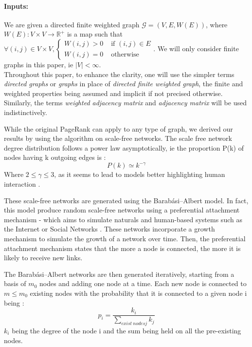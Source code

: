 \documentclass{article}
\begin{document}
\paragraph{Inputs:} We are given a directed finite weighted graph $\mathcal{G} = (V, E, W(E))$, where
$W(E) : V \times V \rightarrow \mathbb{R}^{+}$ is a map such that $\forall (i,j) \in V\times V, \left\{ \begin{array}{cc}
    W(i,j)>0 & \mbox{ if } (i,j) \in E  \\
    W(i,j)=0 & \mbox{ otherwise}
\end{array} \right.$.
We will only consider finite graphs in this paper, ie $|V|<\infty$.\\
Throughout this paper, to enhance the clarity, one will use the simpler terms \textit{directed graphs} or \textit{graphs} in place of \textit{directed finite weighted graph}, the finite and weighted properties being assumed and implicit if not precised otherwise. Similarly, the terms \textit{weighted adjacency matrix} and \textit{adjacency matrix} will be used indistinctively.

While the original PageRank can apply to any type of graph, we derived our results by using the algorithm on scale-free networks. The scale free network degree distribution follows a power law asymptotically, ie the proportion P(k) of nodes having k outgoing edges is :
\begin{equation*}
    P(k) \simeq k^{-\gamma}
\end{equation*}
Where $2 \leq \gamma \leq 3$, as it seems to lead to models better highlighting human interaction \cite{choromański_matuszak_mie}. 

These scale-free networks are generated using the Barabási–Albert model. In fact, this model produce random scale-free networks using a preferential attachment mechanism - which aims to simulate naturals and human-based systems such as the Internet or Social Networks \cite{barabási_albert_1999, albert_barabási_2002}. These networks incorporate a growth mechanism to simulate the growth of a network over time. Then, the preferential attachment mechanism states that the more a node is connected, the more it is likely to receive new links. 

The Barabási–Albert networks are then generated iteratively, starting from a basis of $m_0$ nodes and adding one node at a time. Each new node is connected to $m \leq m_0$ existing nodes with the probability that it is connected to a given node i being : 
\begin{equation*}
    p_i = \frac{k_i}{\sum_{exist \ nodes j} k_j}
\end{equation*}
$k_i$ being the degree of the node i and the sum being held on all the pre-existing nodes.\\
\end{document}
